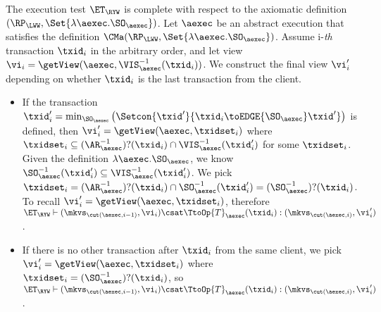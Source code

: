 The execution test $\ET_{\RYW}$ is complete with respect to 
the axiomatic definition $(\RP_{\LWW}, \Set{\lambda \aexec.\SO_{\aexec} })$. 
Let $\aexec$ be an abstract execution that satisfies the definition
$\CMa(\RP_{\LWW}, \Set{\lambda \aexec.\SO_{\aexec} })$.
Assume i-\emph{th} transaction \( \txid_i \) in the arbitrary order,
and let view \( \vi_{i} = \getView(\aexec, \VIS^{-1}_{\aexec}(\txid_{i}) ) \).
We construct the final view \( \vi'_i\) depending on whether \( \txid_i \) is the last transaction from the client.
\begin{itemize}
\item If the transaction \( \txid'_i = \min_{\SO_\aexec}\left(\Setcon{\txid'}{\txid_i \toEDGE{\SO_\aexec} \txid' } \right) \)  is defined,
then \( \vi'_i = \getView(\aexec, \txidset_i) \) where \( \txidset_i \subseteq (\AR_{\aexec}^{-1})?(\txid_i) \cap \VIS_\aexec^{-1}(\txid'_i) \) for some \( \txidset_i \).
Given the definition \( \lambda \aexec.\SO_{\aexec} \), 
we know \( \SO_\aexec^{-1}(\txid'_i) \subseteq \VIS_\aexec^{-1}(\txid'_i) \).
We pick \( \txidset_i = (\AR_\aexec^{-1})?(\txid_i) \cap \SO_\aexec^{-1}(\txid'_i) = (\SO_\aexec^{-1})?(\txid_i) \).
To recall \( \vi'_i = \getView(\aexec, \txidset_i) \), therefore \( \ET_\RYW \vdash (\mkvs_{\cut(\aexec, i-1)}, \vi_i) \csat \TtoOp{T}_{\aexec}(\txid_{i}) : (\mkvs_{\cut(\aexec, i)}, \vi'_{i}) \).
\item If there is no other transaction after \( \txid_i \) from the same client,
we pick \( \vi'_i = \getView(\aexec, \txidset_i) \) where \( \txidset_i = (\SO_\aexec^{-1})?(\txid_i) \),
so \( \ET_\RYW \vdash (\mkvs_{\cut(\aexec, i-1)}, \vi_i) \csat \TtoOp{T}_{\aexec}(\txid_{i}) : (\mkvs_{\cut(\aexec, i)}, \vi'_{i}) \).
\end{itemize}
